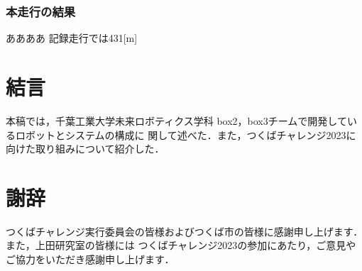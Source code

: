 \documentclass[twocolumn, 9pt]{jsproceedings}
\begin{document}
\subsubsection{本走行の結果}
ああああ
記録走行では431[m]



\section{結言}
本稿では，千葉工業大学未来ロボティクス学科 box2，box3チームで開発しているロボットとシステムの構成に
関して述べた．また，つくばチャレンジ2023に向けた取り組みについて紹介した．\\

\section*{謝辞}
つくばチャレンジ実行委員会の皆様およびつくば市の皆様に感謝申し上げます．また，上田研究室の皆様には
つくばチャレンジ2023の参加にあたり，ご意見やご協力をいただき感謝申し上げます．\\
\end{document}
